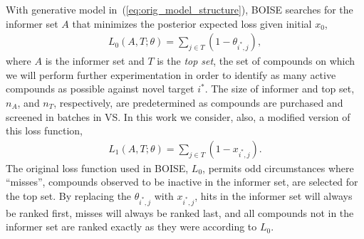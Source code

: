 \documentclass[11pt,a4paper]{article}
\theoremstyle{plain}
\begin{document}
With generative model in~(\ref{eq:orig_model_structure}), BOISE searches for the informer set $A$ that minimizes the posterior expected loss given initial $x_0$,
\begin{eqnarray}
  \label{eq:orig_orig_loss}
  L_0(A, T; \theta) = \sum_{j \in T} \left( 1- \theta_{i^*,j} \right),
\end{eqnarray}
where $A$ is the informer set and $T$ is the \textit{top set}, the set of compounds on which we will perform further experimentation in order to identify as many active compounds as possible against novel target $i^*$.
The size of informer and top set, $n_A$, and $n_T$, respectively, are predetermined as compounds are purchased and screened in batches in VS. 
In this work we consider, also, a modified version of this loss function,
\begin{eqnarray}
\label{eq:orig_loss}
L_1(A, T; \theta) = \sum_{j \in T} \left( 1- x_{i^*,j} \right).
\end{eqnarray}
The original loss function used in BOISE, $L_0$, permits odd circumstances where ``misses'', compounds observed to be inactive in the informer set, are selected for the top set. 
By replacing the $\theta_{i^*,j}$ with $x_{i^*,j}$, hits in the informer set will always be ranked first, misses will always be ranked last, and all compounds not in the informer set are ranked exactly as they were according to $L_0$.


\end{document}
